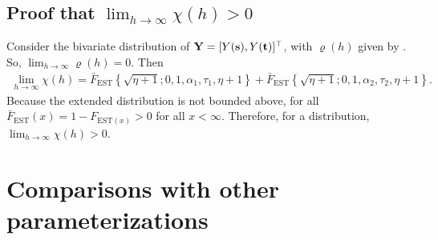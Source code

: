 \subsection*{Proof that $\displaystyle \lim_{h \rightarrow \infty} \chi(h) > 0$}
Consider the bivariate distribution of $\mathbf{Y} = [Y(\mathbf{s}), Y(\mathbf{t})]^\top$, with $\varrho(h)$ given by .
So, $\displaystyle \lim_{h \rightarrow \infty} \varrho(h) = 0$.
Then
\begin{align}
  \lim_{h \rightarrow \infty} \chi(h) = \bar{F}_{\text{EST}}\left\{ \sqrt{\eta + 1}; 0, 1, \alpha_1, \tau_1, \eta + 1 \right\} + \bar{F}_{\text{EST}}\left\{ \sqrt{\eta + 1}; 0, 1, \alpha_2, \tau_2, \eta + 1 \right\}.
\end{align}
Because the extended \skewt distribution is not bounded above, for all $\bar{F}_{\text{EST}}(x) = 1 - F_{\text{EST} (x)} > 0$ for all $x < \infty$.
Therefore, for a \skewt distribution, $\displaystyle \lim_{h \rightarrow \infty} \chi(h) > 0$.

\section{Comparisons with other parameterizations}

